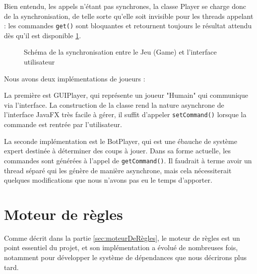 \documentclass[a4paper]{report}
\begin{document}
Bien entendu, les appels n'étant pas synchrones, la classe Player se charge donc de la synchronisation, de telle sorte qu'elle soit invisible pour les threads appelant : les commandes {\tt get()} sont bloquantes et retournent toujours le résultat attendu dès qu'il est disponible \ref{fig:player_synchro}.
\begin{figure}[h]
\centering
{}
\caption{Schéma de la synchronisation entre le Jeu (Game) et l'interface utilisateur}
\label{fig:player_synchro}
\end{figure}

Nous avons deux implémentations de joueurs : 

La première est GUIPlayer, qui représente un joueur "Humain" qui communique via l'interface. La construction de la classe rend la nature asynchrone de l'interface JavaFX très facile à gérer, il suffit d'appeler {\tt setCommand()} lorsque la commande est rentrée par l'utilisateur.

La seconde implémentation est le BotPlayer, qui est une ébauche de système expert destinée à déterminer des coups à jouer. Dans sa forme actuelle, les commandes sont générées à l'appel de {\tt getCommand()}. Il faudrait à terme avoir un thread séparé qui les génère de manière asynchrone, mais cela nécessiterait quelques modifications que nous n'avons pas eu le temps d’apporter.

\section{Moteur de règles}

Comme décrit dans la partie \ref{sec:moteurDeRègles}, le moteur de règles est un point essentiel du projet, et son implémentation a évolué de nombreuses fois, notamment pour développer le système de dépendances que nous décrirons plus tard.
\end{document}
